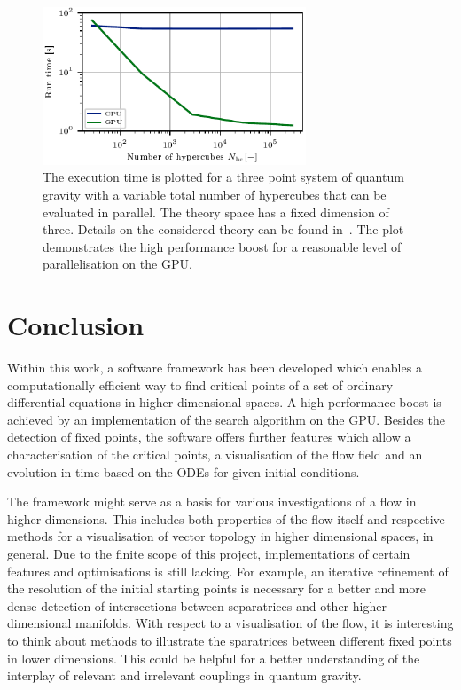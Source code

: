 \documentclass[paper=a4,11pt,bibliography=totoc]{scrartcl}
\begin{document}
\begin{figure}
	\centering\includegraphics[width=0.7\textwidth]{performance_plot2}
	\caption{The execution time is plotted for a three point system of quantum gravity with a variable total number of hypercubes that can be evaluated in parallel. The theory space has a fixed dimension of three. Details on the considered theory can be found in~\cite{Pawlowski2018}. The plot demonstrates the high performance boost for a reasonable level of parallelisation on the GPU.}
	\label{fig:performance2}
\end{figure}

\section{Conclusion}
\label{sec:conc}

Within this work, a software framework has been developed which enables a computationally efficient way to find critical points of a set of ordinary differential equations in higher dimensional spaces. A high performance boost is achieved by an implementation of the search algorithm on the GPU. Besides the detection of fixed points, the software offers further features which allow a characterisation of the critical points, a visualisation of the flow field and an evolution in time based on the ODEs for given initial conditions.

The framework might serve as a basis for various investigations of a flow in higher dimensions. This includes both properties of the flow itself and respective methods for a visualisation of vector topology in higher dimensional spaces, in general. Due to the finite scope of this project, implementations of certain features and optimisations is still lacking. For example, an iterative refinement of the resolution of the initial starting points is necessary for a better and more dense detection of intersections between separatrices and other higher dimensional manifolds. With respect to a visualisation of the flow, it is interesting to think about methods to illustrate the sparatrices between different fixed points in lower dimensions. This could be helpful for a better understanding of the interplay of relevant and irrelevant couplings in quantum gravity.
\end{document}
